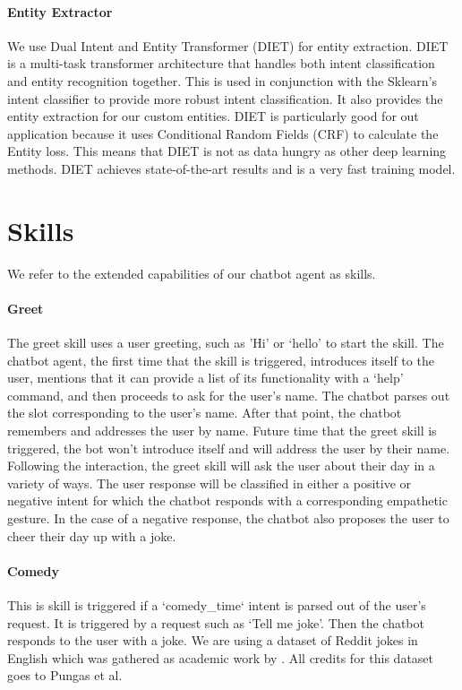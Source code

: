 \documentclass[11pt,a4paper]{article}
\begin{document}
\paragraph{Entity Extractor} We use Dual Intent and Entity Transformer (DIET) for entity extraction. 
DIET is a multi-task transformer architecture that handles both intent classification and entity recognition together. This is used in conjunction with the Sklearn's intent classifier to provide more robust intent classification. It also provides the entity extraction for our custom entities. DIET is particularly good for out application because it uses Conditional Random Fields (CRF) to calculate the Entity loss. This means that DIET is not as data hungry as other deep learning methods. DIET achieves state-of-the-art results and is a very fast training model.

\section{Skills}

We refer to the extended capabilities of our chatbot agent as skills.

\paragraph{Greet}
The greet skill uses a user greeting, such as 'Hi' or `hello' to start the skill. The chatbot agent, the first time that the skill is triggered, introduces itself to the user, mentions that it can provide a list of its functionality with a `help' command, and then proceeds to ask for the user's name. The chatbot parses out the slot corresponding to the user's name. After that point, the chatbot remembers and addresses the user by name. Future time that the greet skill is triggered, the bot won't introduce itself and will address the user by their name. Following the interaction, the greet skill will ask the user about their day in a variety of ways. The user response will be classified in either a positive or negative intent for which the chatbot responds with a corresponding empathetic gesture. In the case of a negative response, the chatbot also proposes the user to cheer their day up with a joke.

\paragraph{Comedy}
This is skill is triggered if a `comedy\_time` intent is parsed out of the user's request. It is triggered by a request such as `Tell me joke'. Then the chatbot responds to the user with a joke. We are using a dataset of Reddit jokes in English which was gathered as academic work by \cite{pungas}. All credits for this dataset goes to Pungas et al.
\end{document}
